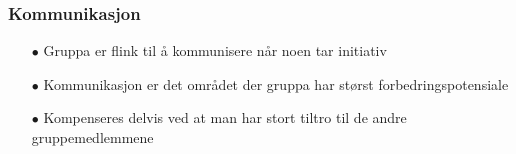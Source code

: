 \documentclass[screen]{beamer}
\begin{document}
\begin{frame}
  \frametitle{Kommunikasjon}
  \begin{itemize}
    \item[$\bullet$] Gruppa er flink til å kommunisere når noen tar initiativ
    \item[$\bullet$] Kommunikasjon er det området der gruppa har størst forbedringspotensiale
    \item[$\bullet$] Kompenseres delvis ved at man har stort tiltro til de andre gruppemedlemmene
  \end{itemize}
\end{frame}
\end{document}
